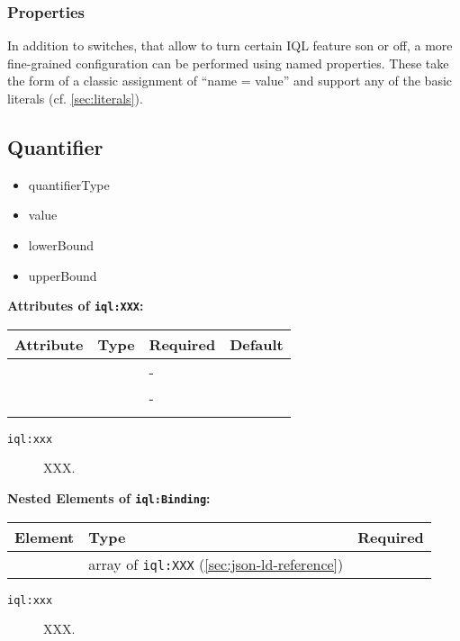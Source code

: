 \documentclass[11pt]{article}
\newcommand{\iqlns}{iql:}
\newcommand{\iqlType}[1]{\texttt{\iqlns#1}}
\newcommand{\attributes}[1]{\noindent\textbf{Attributes of \iqlType{#1}:}\newline\medskip}
\newcommand{\elements}[1]{\noindent\textbf{Nested Elements of \iqlType{#1}:}\newline\medskip}
\begin{document}
\subsubsection{Properties}
\label{sec:json-ld-properties}

In addition to switches, that allow to turn certain IQL feature son or off, a more fine-grained configuration can be performed using named properties. These take the form of a classic assignment of ``name = value'' and support any of the basic literals (cf. \cref{sec:literals}).

\subsection{Quantifier}
\label{sec:json-ld-quantifier}
\begin{itemize}
\item quantifierType
\item value
\item lowerBound
\item upperBound
\end{itemize}
\attributes{XXX}
\begin{tabular}{|p{}|p{}|p{}|p{}|}
	\hline
	\textbf{Attribute} & \textbf{Type} & \textbf{Required} & \textbf{Default} \\ 
	\hline
	\hline
	&  & - &  \\ 
	\hline 
	&  & - &  \\ 
	\hline 
	&  &  & \\ 
	\hline 
\end{tabular}
\begin{description}
	\item[\iqlType{xxx}] XXX.
\end{description}
\elements{Binding}
\begin{tabular}{|p{}|p{}|p{}|}
	\hline
	\textbf{Element} & \textbf{Type} & \textbf{Required} \\ 
	\hline
	\hline 
	& array of \iqlType{XXX} (\ref{sec:json-ld-reference}) &  \\ 
	\hline 
\end{tabular}
\begin{description}
	\item[\iqlType{xxx}] XXX.
\end{description}
\end{document}
